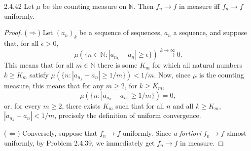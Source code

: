 \documentclass[11pt]{article}
\begin{document}
\begin{problem}{2.4.42}
	Let \(\mu\) be the counting measure on \( \mathbb{N} \).
	Then \( f_n \rightarrow f \) in measure iff \( f_n \rightarrow f \) uniformly.
\end{problem}
\begin{proof}
	(\(\Rightarrow\)) Let \( (a_n)_k \) be a sequence of sequences, \( a_n \) a sequence, and suppose that, for all \(\epsilon > 0\),
	\begin{equation}
		\label{eq:12}
		\mu(\{ n \in \mathbb{N}: |a_{n_k} - a_n| \geq \epsilon\}) \xrightarrow{k \rightarrow \infty} 0.
	\end{equation}
	This means that for all \( m \in \mathbb{N} \) there is some \( K_{m} \) for which all natural numbers \( k \geq K_{m} \) satisfy \( \mu(\{n: |a_{n_k} - a_n| \geq 1/m \}) < 1/m \).
	Now, since \( \mu \) is the counting measure, this means that for any \( m \geq 2 \), for \( k \geq K_m \),
	\begin{equation}
		\label{eq:13}
		\mu(\{n: |a_{n_k} - a_n| \geq 1/m\}) = 0,
	\end{equation}
	or, for every \( m \geq 2 \), there exists \( K_m \) such that for all \( n \) and all \( k \geq K_m \), \( |a_{n_k} - a_n| < 1/m \), precisely the definition of uniform convergence.

	(\(\Leftarrow\)) Conversely, suppose that \( f_n \rightarrow f \) uniformly. Since \textit{a fortiori} \( f_n \rightarrow f \) almost uniformly, by Problem 2.4.39, we immediately get \( f_{n} \rightarrow f \) in measure.
\end{proof}
\end{document}
